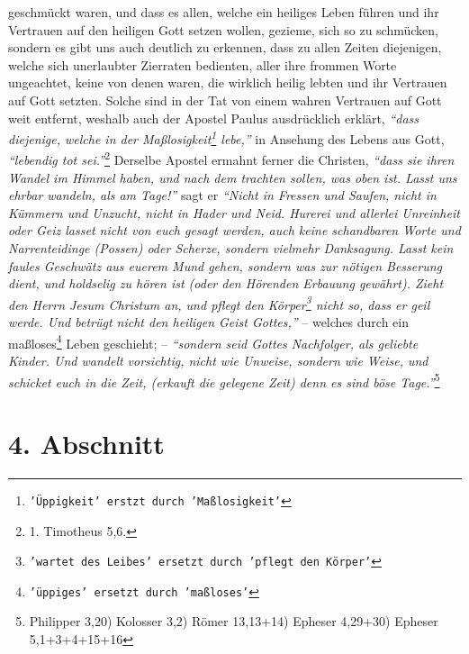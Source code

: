 geschmückt waren,
und dass es allen, welche ein heiliges Leben führen und ihr Vertrauen auf den
heiligen Gott setzen wollen, gezieme, sich so zu schmücken, sondern es gibt uns
auch deutlich zu erkennen, dass zu allen Zeiten diejenigen, welche sich
unerlaubter Zierraten bedienten, aller ihre frommen Worte ungeachtet, keine von
denen waren, die wirklich heilig lebten und ihr Vertrauen auf Gott setzten.
Solche sind in der Tat von einem wahren Vertrauen auf Gott weit entfernt,
weshalb auch der Apostel Paulus ausdrücklich erklärt,
\textit{"`dass diejenige, welche
in der Maßlosigkeit\footnote{\texttt{'Üppigkeit' erstzt durch 'Maßlosigkeit'}}
lebe,"'} in 
Ansehung des Lebens aus Gott,
\textit{"`lebendig tot sei."'}\footnote{1. Timotheus 5,6.}
Derselbe Apostel ermahnt ferner die Christen,
\textit{"`dass sie ihren Wandel im Himmel haben, und nach dem trachten sollen,
was oben
ist. Lasst uns ehrbar wandeln, als am Tage!"'} sagt er
\textit{"`Nicht in Fressen und
Saufen, nicht in Kümmern und Unzucht, nicht in Hader und Neid. Hurerei und
allerlei Unreinheit oder Geiz lasset nicht von euch gesagt werden, auch keine
schandbaren Worte und Narrenteidinge (Possen) oder Scherze, sondern vielmehr
Danksagung. Lasst kein faules Geschwätz aus euerem Mund gehen, sondern was zur
nötigen Besserung dient, und holdselig zu hören ist (oder den Hörenden
Erbauung gewährt). Zieht den Herrn Jesum Christum an, und pflegt den
Körper\footnote{\texttt{'wartet des Leibes' 
ersetzt durch 'pflegt den Körper'}} 
nicht so, dass er geil werde. Und betrügt nicht den heiligen Geist Gottes,"'} --
welches durch ein maßloses\footnote{\texttt{'üppiges' ersetzt durch 'maßloses'}}
Leben geschieht; --
\textit{"`sondern seid Gottes Nachfolger,
als geliebte Kinder. Und wandelt vorsichtig, nicht wie Unweise, sondern wie
Weise, und schicket euch in die Zeit, (erkauft die gelegene Zeit) denn es sind
böse Tage."'}\footnote{Philipper 3,20)  Kolosser 3,2)  Römer 13,13+14) Epheser
4,29+30) Epheser 5,1+3+4+15+16}

\section{4. Abschnitt} \label{kap15_ab4}

